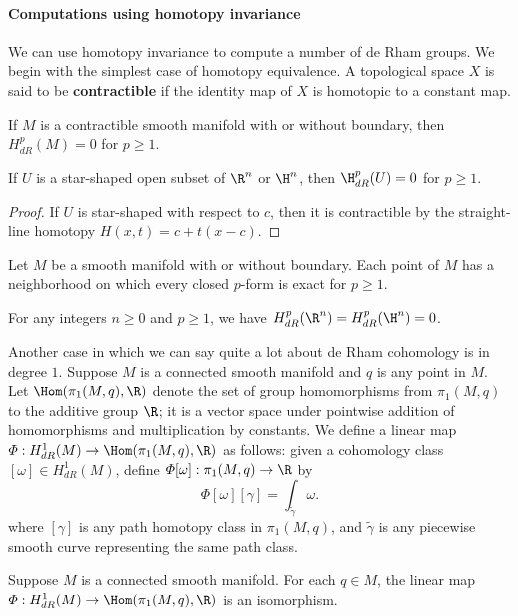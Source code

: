 \paragraph{Computations using homotopy invariance}
We can use homotopy invariance to compute a number of de Rham groups. We begin with the simplest case of homotopy equivalence. A topological space $X$ is said to
be \textbf{contractible} if the identity map of $X$ is homotopic to a constant map.
\begin{theorem}
If $M$ is a contractible smooth manifold with or without boundary, then $H^p_{dR}(M)=0$ for $p\geq 1$.
\end{theorem}
\begin{theorem}
If $U$ is a star-shaped open subset of $\R^n$ or $\H^n$, then $\H^p_{dR}(U)=0$ for $p\geq1$.
\end{theorem}
\begin{proof}
If $U$ is star-shaped with respect to $c$, then it is contractible by the straight-line homotopy $H(x,t)=c+t(x-c)$.
\end{proof}
\begin{corollary}
Let $M$ be a smooth manifold with or without boundary. Each point of $M$ has a neighborhood on which every closed $p$-form is exact for $p\geq 1$.
\end{corollary}
\begin{corollary}
For any integers $n\geq 0$ and $p\geq1$, we have $H^p_{dR}(\R^n)=H^p_{dR}(\H^n)=0$.
\end{corollary}
Another case in which we can say quite a lot about de Rham cohomology is in degree $1$. Suppose $M$ is a connected smooth manifold and $q$ is any point in $M$. Let $\Hom(\pi_1(M,q),\R)$ denote the set of group homomorphisms from $\pi_1(M,q)$ to the additive group $\R$; it is a vector space under pointwise addition of homomorphisms and multiplication by constants. We define a linear map $\varPhi:H^1_{dR}(M)\to\Hom(\pi_1(M,q),\R)$ as follows: given a cohomology class $[\omega]\in H^1_{dR}(M)$, define $\varPhi[\omega]:\pi_1(M,q)\to\R$ by
\[\varPhi[\omega][\gamma]=\int_{\widetilde{\gamma}}\omega.\]
where $[\gamma]$ is any path homotopy class in $\pi_1(M,q)$, and $\widetilde{\gamma}$ is any piecewise smooth curve representing the same path class.
\begin{theorem}\label{cohomology fundamental group}
Suppose $M$ is a connected smooth manifold. For each $q\in M$, the linear map $\varPhi:H^1_{dR}(M)\to\Hom(\pi_1(M,q),\R)$ is an isomorphism.
\end{theorem}
